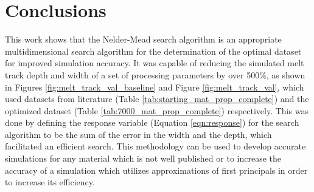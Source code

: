 \documentclass[pdflatex,sn-mathphys]{sn-jnl}
\begin{document}
\section{Conclusions} \label{conclusions}

This work shows that the Nelder-Mead search algorithm is an appropriate multidimensional search algorithm for the determination of the optimal dataset for improved simulation accuracy.  It was capable of reducing the simulated melt track depth and width of a set of processing parameters by over 500\%, as shown in Figures \ref{fig:melt_track_val_baseline} and Figure \ref{fig:melt_track_val}, which used datasets from literature (Table \ref{tab:starting_mat_prop_complete}) and the optimized dataset (Table \ref{tab:7000_mat_prop_complete}) respectively.  This was done by defining the response variable (Equation \ref{eqn:response}) for the search algorithm to be the sum of the error in the width and the depth, which facilitated an efficient search.  
This methodology can be used to develop accurate simulations for any material which is not well published or to increase the accuracy of a simulation which utilizes approximations of first principals in order to increase its efficiency.



\end{document}
